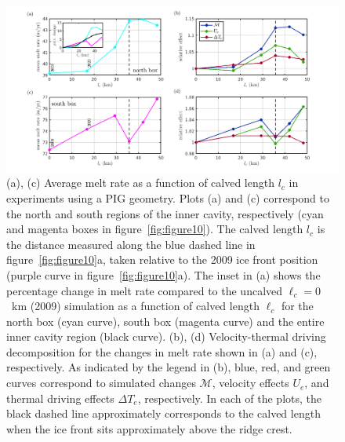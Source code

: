 \documentclass[draft]{agujournal2019}
\begin{document}
\begin{figure}
    \centering
    \includegraphics[width = \textwidth]{../make_figures/plots/figure13.png}
    \caption{(a), (c) Average melt rate as a function of calved length $l_c$ in experiments using a PIG geometry. Plots (a) and (c) correspond to the north and south regions of the inner cavity, respectively (cyan and magenta boxes in figure~\ref{fig:figure10}). The calved length $l_c$ is the distance measured along the blue dashed line in figure~\ref{fig:figure10}a, taken relative to the 2009 ice front position (purple curve in figure~\ref{fig:figure10}a). The inset in (a) shows the percentage change in melt rate compared to the uncalved $\ell_c =0$~km (2009) simulation as a function of calved length $\ell_c$ for the north box (cyan curve), south box (magenta curve) and the entire inner cavity region (black curve). (b), (d) Velocity-thermal driving decomposition for the changes in melt rate shown in (a) and (c), respectively. As indicated by the legend in (b), blue, red, and green curves correspond to simulated changes $\mathcal{M}$, velocity effects $U_e$, and thermal driving effects $\Delta T_e$, respectively. In each of the plots, the black dashed line approximately corresponds to the calved length when the ice front sits approximately above the ridge crest.}\label{fig:figure13}
\end{figure}
\end{document}
